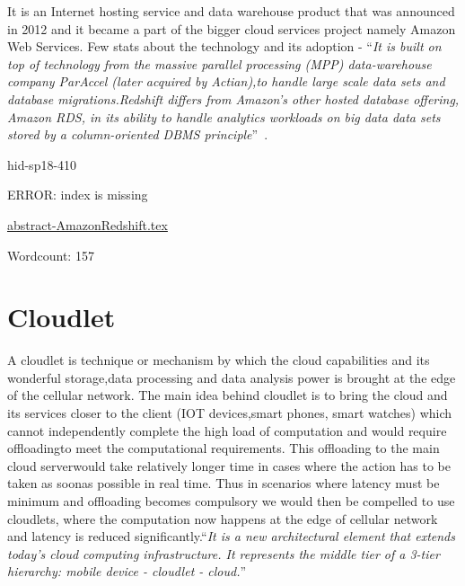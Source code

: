 It is an Internet hosting service and data warehouse product that was
announced in 2012 and it became a part of the bigger cloud services
project namely Amazon Web Services. Few stats about the technology and
its adoption - \color{blue}``\emph{It is built on top of technology from the massive
parallel processing (MPP) data-warehouse company ParAccel (later
acquired by Actian),to handle large scale data sets and database
migrations.Redshift differs from Amazon's other hosted database
offering, Amazon RDS, in its ability to handle analytics workloads on
big data data sets stored by a column-oriented DBMS
principle}''\color{black}~\cite{hid-sp18-410-AmazonWiki}.



\begin{IU}

hid-sp18-410

ERROR: index is missing

\href{https://github.com/cloudmesh-community/hid-sp18-410/blob/master//technology/abstract-AmazonRedshift.tex}{abstract-AmazonRedshift.tex}

 

Wordcount: 157

\end{IU}

\section{Cloudlet}


A cloudlet is technique or mechanism by which the cloud capabilities
and its wonderful storage,data processing and data analysis power is
brought at the edge of the cellular network.  The main idea behind
cloudlet is to bring the cloud and its services closer to the
client (IOT devices,smart phones, smart watches) which cannot
independently complete the high load of computation and would require
offloadingto meet the computational requirements. This offloading to
the main cloud serverwould take relatively longer time in cases where
the action has to be taken as soonas possible in real time. Thus in
scenarios where latency must be minimum and offloading becomes
compulsory we would then be compelled to use cloudlets, where the
computation now happens at the edge of cellular network and latency is
reduced significantly.\color{blue}``\emph{It is a new architectural element that extends
today’s cloud computing infrastructure.  It represents the middle tier
of a 3-tier hierarchy: mobile device - cloudlet -
cloud.}''\color{black}~\cite{hid-sp18-410-wikiCloudlet}

